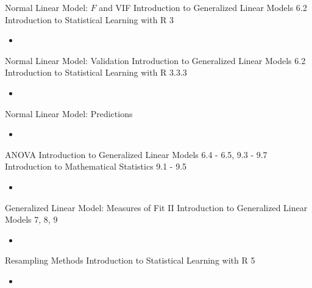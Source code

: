 \begin{CHPT_SUMM_AUTO_NUMB}[label = {L.-48}]{Normal Linear Model: $F$ and VIF}
Introduction to Generalized Linear Models 6.2
Introduction to Statistical Learning with R 3
	\begin{itemize}
		\item	
	\end{itemize}
\end{CHPT_SUMM_AUTO_NUMB}

\begin{CHPT_SUMM_AUTO_NUMB}[label = {L.-49}]{Normal Linear Model: Validation}
Introduction to Generalized Linear Models 6.2
Introduction to Statistical Learning with R 3.3.3
	\begin{itemize}
		\item	
	\end{itemize}
\end{CHPT_SUMM_AUTO_NUMB}

\begin{CHPT_SUMM_AUTO_NUMB}[label = {L.-50}]{Normal Linear Model: Predictions}
	\begin{itemize}
		\item	
	\end{itemize}
\end{CHPT_SUMM_AUTO_NUMB}

\begin{CHPT_SUMM_AUTO_NUMB}[label = {L.-51}]{ANOVA}
Introduction to Generalized Linear Models 6.4 - 6.5, 9.3 - 9.7
Introduction to Mathematical Statistics 9.1 - 9.5
	\begin{itemize}
		\item	
	\end{itemize}
\end{CHPT_SUMM_AUTO_NUMB}

\begin{CHPT_SUMM_AUTO_NUMB}[label = {L.-52}]{Generalized Linear Model: Measures of Fit II}
Introduction to Generalized Linear Models 7, 8, 9
	\begin{itemize}
		\item	
	\end{itemize}
\end{CHPT_SUMM_AUTO_NUMB}

\begin{CHPT_SUMM_AUTO_NUMB}[label = {L.-53}]{Resampling Methods}
Introduction to Statistical Learning with R 5
	\begin{itemize}
		\item	
	\end{itemize}
\end{CHPT_SUMM_AUTO_NUMB}

